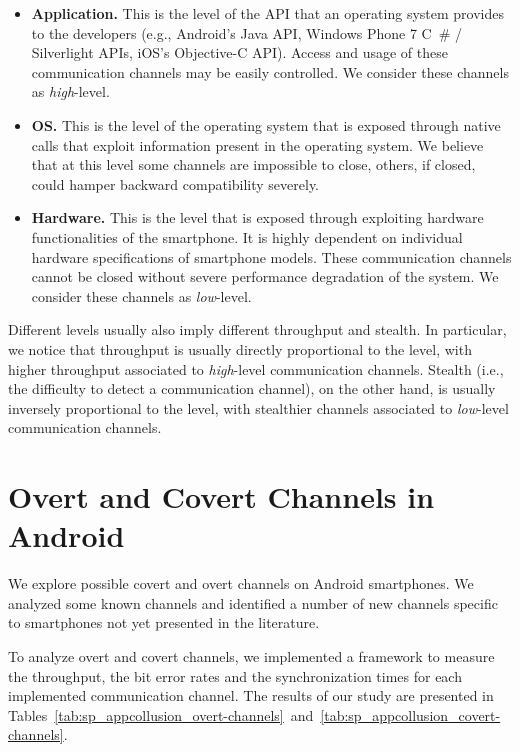 \begin{itemize}
\item \textbf{Application.} This is the level of the API that an
  operating system provides to the developers (e.g., Android's Java
  API, Windows Phone 7 C~\# / Silverlight APIs, iOS's Objective-C
  API). Access and usage of these communication channels may be easily
  controlled. We consider these channels as \emph{high}-level.
\item \textbf{OS.} This is the level of the operating system that is
  exposed through native calls that exploit information present in the
  operating system. We believe that at this level some channels are
  impossible to close, others, if closed, could hamper backward
  compatibility severely.
\item \textbf{Hardware.} This is the level that is exposed through
  exploiting hardware functionalities of the smartphone. It is highly
  dependent on individual hardware specifications of smartphone
  models. These communication channels cannot be closed without severe
  performance degradation of the system. We consider these channels as
  \emph{low}-level.
\end{itemize}

Different levels usually also imply different throughput and
stealth. In particular, we notice that throughput is usually directly
proportional to the level, with higher throughput associated to
\emph{high}-level communication channels. Stealth (i.e., the
difficulty to detect a communication channel), on the other hand, is
usually inversely proportional to the level, with stealthier channels
associated to \emph{low}-level communication channels.


\section{Overt and Covert Channels in Android}
\label{sec:sp_appcollusion_case-study}
We explore possible covert and overt channels on Android
smartphones. We analyzed some known channels and identified a number
of new channels specific to smartphones not yet presented in the
literature.

To analyze overt and covert channels, we implemented a framework to
measure the throughput, the bit error rates and the synchronization
times for each implemented communication channel. The results of our
study are presented in
Tables~\ref{tab:sp_appcollusion_overt-channels}~and~\ref{tab:sp_appcollusion_covert-channels}.


